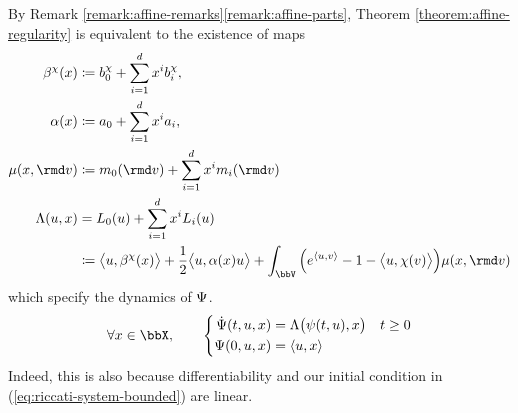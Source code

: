 \begin{remark}
  \label{remark:riccati-affine-formulation}
  By Remark \ref{remark:affine-remarks}\ref{remark:affine-parts}, Theorem \ref{theorem:affine-regularity} is equivalent to the existence of maps
  \begin{equation}
    \label{eq:affine-maps}
    \begin{aligned}
      \affDrift^\trunc(\stateVar) 
      &\defeq \affDriftPart_0^\trunc + \sum_{i=1}^d \stateVar^i \affDriftPart_i^\trunc, \\
      \affDiff(\stateVar) 
      &\defeq \affDiffPart_0 + \sum_{i=1}^d \stateVar^i \affDiffPart_i, \\
      \affJump(\stateVar, \rmd\markVar) 
      &\defeq \affJumpPart_0(\rmd\markVar) + \sum_{i=1}^d \stateVar^i \affJumpPart_i(\rmd\markVar) \\
      \ode(\momentVar, \stateVar) 
      &= \odePart_0(\momentVar) + \sum_{i=1}^d \stateVar^i \odePart_i(\momentVar) \\
      &\defeq \bprj{\momentVar}{\affDrift^\trunc(\stateVar)} + \frac12 \bprj{\momentVar}{\affDiff(\stateVar)\momentVar} + \int_\vecSpace \Big( e^\prj{\momentVar}{\markVar} - 1 - \bprj{\momentVar}{\trunc(\markVar)} \Big) \affJump(\stateVar, \rmd\markVar) \\
    \end{aligned}
  \end{equation}
  which specify the dynamics of $\Psi$.
  \begin{equation}
    \label{eq:riccati-system-bounded}
    \forall \stateVar \in \stateSpace, \qquad \left\{\begin{aligned}
      \dot\aff(t, \momentVar, \stateVar) &= \ode\big(\affPart(t,\momentVar), \stateVar\big) & t \geq 0 \\
      \aff(0,\momentVar, \stateVar) &= \prj{\momentVar}{\stateVar}
    \end{aligned}\right.
  \end{equation}
  Indeed, this is also because differentiability and our initial condition in (\ref{eq:riccati-system-bounded}) are linear.
\end{remark}
